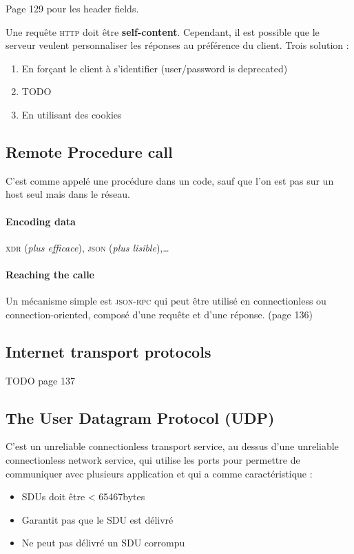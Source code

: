 Page 129 pour les header fields.


Une requête \textsc{http} doit être \textbf{self-content}. Cependant, il est possible que
le serveur veulent personnaliser les réponses au préférence du client. Trois solution :
\begin{enumerate}
    \item En forçant le client à s'identifier (user/password is deprecated)
    \item TODO
    \item En utilisant des cookies
\end{enumerate}

\subsection{Remote Procedure call}
C'est comme appelé une procédure dans un code, sauf que l'on est pas sur
un host seul mais dans le réseau.

\paragraph{Encoding data}
\textsc{xdr} (\textit{plus efficace}), \textsc{json} (\textit{plus lisible}),\ldots

\paragraph{Reaching the calle}
Un mécanisme simple est \textsc{json-rpc} qui peut être utilisé en connectionless ou
connection-oriented, composé d'une requête et d'une réponse. (page 136)

\subsection{Internet transport protocols}
TODO page 137

\subsection{The User Datagram Protocol (UDP)}

C'est un unreliable connectionless transport service, au dessus d'une unreliable
connectionless network service, qui utilise les ports
pour permettre de communiquer avec plusieurs application et qui a comme
caractéristique :
\begin{itemize}
    \item SDUs doit être < 65467bytes
    \item Garantit pas que le SDU est délivré
    \item Ne peut pas délivré un SDU corrompu
\end{itemize}

